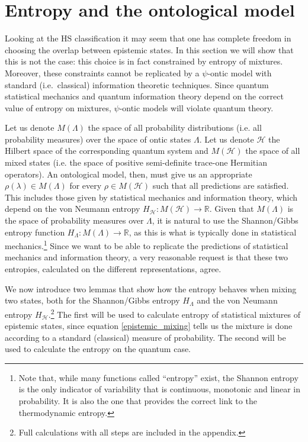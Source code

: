\documentclass[10pt,twocolumn, nofootinbib]{revtex4-2}
\begin{document}
\section{Entropy and the ontological model}

Looking at the HS classification it may seem that one has complete freedom in choosing the overlap between epistemic states. In this section we will show that this is not the case: this choice is in fact constrained by entropy of mixtures. Moreover, these constraints cannot be replicated by a $\psi$-ontic model with standard (i.e.\ classical) information theoretic techniques. Since quantum statistical mechanics and quantum information theory depend on the correct value of entropy on mixtures, $\psi$-ontic models will violate quantum theory.

Let us denote $M(\Lambda)$ the space of all probability distributions (i.e. all probability measures) over the space of ontic states $\Lambda$. Let us denote $\mathcal{H}$ the Hilbert space of the corresponding quantum system and $M(\mathcal{H})$ the space of all mixed states (i.e. the space of positive semi-definite trace-one Hermitian operators). An ontological model, then, must give us an appropriate $\rho(\lambda) \in M(\Lambda)$ for every $\rho \in M(\mathcal{H})$ such that all predictions are satisfied. This includes those given by statistical mechanics and information theory, which depend on the von Neumann entropy $H_\mathcal{H} : M(\mathcal{H}) \to \mathbb{R}$. Given that $M(\Lambda)$ is the space of probability measures over $\Lambda$, it is natural to use the Shannon/Gibbs entropy function $H_\Lambda : M(\Lambda) \to \mathbb{R}$, as this is what is typically done in statistical mechanics.\footnote{Note that, while many functions called ``entropy'' exist, the Shannon entropy is the only indicator of variability that is continuous, monotonic and linear in probability.\cite{aop-phys-variability} It is also the one that provides the correct link to the thermodynamic entropy.} Since we want to be able to replicate the predictions of statistical mechanics and information theory, a very reasonable request is that these two entropies, calculated on the different representations, agree.

We now introduce two lemmas that show how the entropy behaves when mixing two states, both for the Shannon/Gibbs entropy $H_\Lambda$ and the von Neumann entropy $H_\mathcal{H}$.\footnote{Full calculations with all steps are included in the appendix.} The first will be used to calculate entropy of statistical mixtures of epistemic states, since equation \ref{epistemic_mixing} tells us the mixture is done according to a standard (classical) measure of probability. The second will be used to calculate the entropy on the quantum case.
\end{document}

